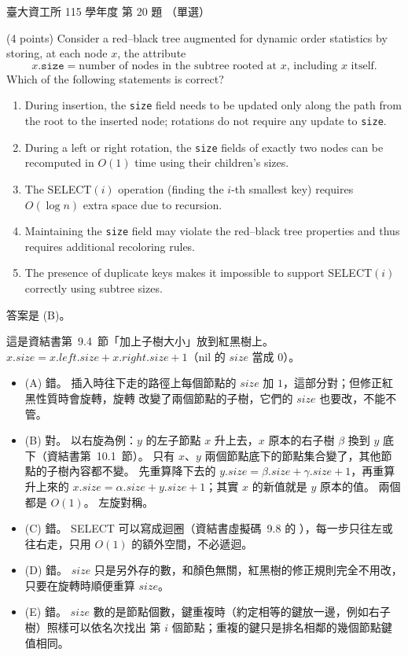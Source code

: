 \begin{pastexam}[label={px:ntu-115-dsa-20}]{臺大資工所 115 學年度 第 20 題}
（單選）

(4 points) Consider a red--black tree augmented for dynamic order statistics by storing, at each node $x$, the attribute
\[ x.\texttt{size} = \text{number of nodes in the subtree rooted at } x\text{, including } x \text{ itself.} \]
Which of the following statements is correct?
\begin{enumerate}[label=(\Alph*)]
\item During insertion, the \texttt{size} field needs to be updated only along the path from the root to the inserted node; rotations do not require any update to \texttt{size}.
\item During a left or right rotation, the \texttt{size} fields of exactly two nodes can be recomputed in $O(1)$ time using their children's sizes.
\item The SELECT$(i)$ operation (finding the $i$-th smallest key) requires $O(\log n)$ extra space due to recursion.
\item Maintaining the \texttt{size} field may violate the red--black tree properties and thus requires additional recoloring rules.
\item The presence of duplicate keys makes it impossible to support SELECT$(i)$ correctly using subtree sizes.
\end{enumerate}
\end{pastexam}

\begin{pastsoln}
答案是 (B)。

這是資結書第~9.4~節「加上子樹大小」放到紅黑樹上。 $x.\mathit{size} = x.\mathit{left}.\mathit{size} +
x.\mathit{right}.\mathit{size} + 1$（nil 的 $\mathit{size}$ 當成 $0$）。
\begin{itemize}
\item (A) 錯。 插入時往下走的路徑上每個節點的 $\mathit{size}$ 加 $1$，這部分對；但修正紅黑性質時會旋轉，旋轉
改變了兩個節點的子樹，它們的 $\mathit{size}$ 也要改，不能不管。
\item (B) 對。 以右旋為例：$y$ 的左子節點 $x$ 升上去，$x$ 原本的右子樹 $\beta$ 換到 $y$ 底下（資結書第~10.1~節）。
只有 $x$、$y$ 兩個節點底下的節點集合變了，其他節點的子樹內容都不變。 先重算降下去的
$y.\mathit{size} = \beta.\mathit{size} + \gamma.\mathit{size} + 1$，再重算升上來的
$x.\mathit{size} = \alpha.\mathit{size} + y.\mathit{size} + 1$；其實 $x$ 的新值就是 $y$ 原本的值。 兩個都是 $O(1)$。
左旋對稱。
\item (C) 錯。 SELECT 可以寫成迴圈（資結書虛擬碼~9.8 的 ），每一步只往左或往右走，只用 $O(1)$
的額外空間，不必遞迴。
\item (D) 錯。 $\mathit{size}$ 只是另外存的數，和顏色無關，紅黑樹的修正規則完全不用改，只要在旋轉時順便重算
$\mathit{size}$。
\item (E) 錯。 $\mathit{size}$ 數的是節點個數，鍵重複時（約定相等的鍵放一邊，例如右子樹）照樣可以依名次找出
第 $i$ 個節點；重複的鍵只是排名相鄰的幾個節點鍵值相同。
\end{itemize}
\end{pastsoln}

